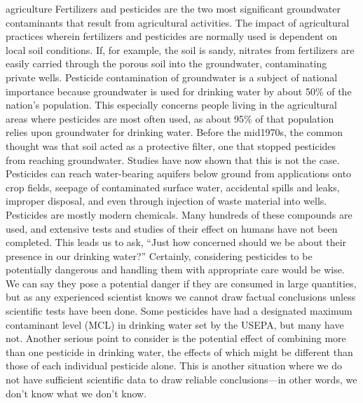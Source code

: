 \documentclass{article}
\begin{document}
agriculture Fertilizers and pesticides are the two most significant
groundwater contaminants that result from agricultural activities. The
impact of agricultural practices wherein fertilizers and pesticides are
normally used is dependent on local soil conditions. If, for example,
the soil is sandy, nitrates from fertilizers are easily carried through
the porous soil into the groundwater, contaminating private wells.
Pesticide contamination of groundwater is a subject of national
importance because groundwater is used for drinking water by about 50\%
of the nation's population. This especially concerns people living in
the agricultural areas where pesticides are most often used, as about
95\% of that population relies upon groundwater for drinking water.
Before the mid1970s, the common thought was that soil acted as a
protective filter, one that stopped pesticides from reaching
groundwater. Studies have now shown that this is not the case.
Pesticides can reach water-bearing aquifers below ground from
applications onto crop fields, seepage of contaminated surface water,
accidental spills and leaks, improper disposal, and even through
injection of waste material into wells. Pesticides are mostly modern
chemicals. Many hundreds of these compounds are used, and extensive
tests and studies of their effect on humans have not been completed.
This leads us to ask, ``Just how concerned should we be about their
presence in our drinking water?'' Certainly, considering pesticides to
be potentially dangerous and handling them with appropriate care would
be wise. We can say they pose a potential danger if they are consumed in
large quantities, but as any experienced scientist knows we cannot draw
factual conclusions unless scientific tests have been done. Some
pesticides have had a designated maximum contaminant level (MCL) in
drinking water set by the USEPA, but many have not. Another serious
point to consider is the potential effect of combining more than one
pesticide in drinking water, the effects of which might be different
than those of each individual pesticide alone. This is another situation
where we do not have sufficient scientific data to draw reliable
conclusions---in other words, we don't know what we don't know.
\end{document}
